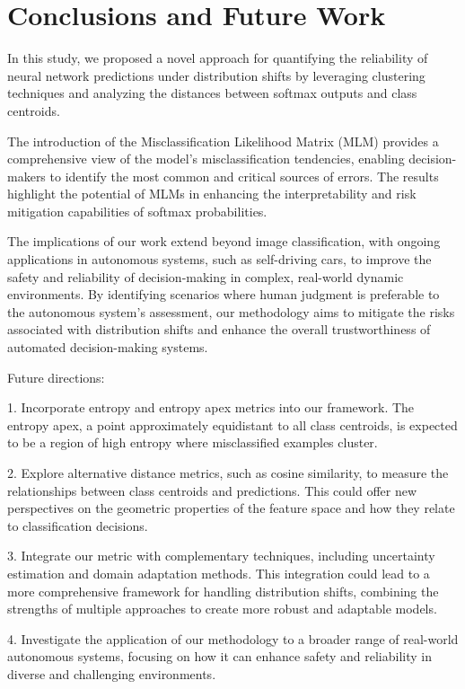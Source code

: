 
\section{Conclusions and Future Work}

In this study, we proposed a novel approach for quantifying the reliability of neural network predictions under distribution shifts by leveraging clustering techniques and analyzing the distances between softmax outputs and class centroids. 

The introduction of the Misclassification Likelihood Matrix (MLM) provides a comprehensive view of the model's misclassification tendencies, enabling decision-makers to identify the most common and critical sources of errors.
The results highlight the potential of MLMs in enhancing the interpretability and risk mitigation capabilities of softmax probabilities.


The implications of our work extend beyond image classification, with ongoing applications in autonomous systems, such as self-driving cars, to improve the safety and reliability of decision-making in complex, real-world dynamic environments. 
By identifying scenarios where human judgment is preferable to the autonomous system's assessment, our methodology aims to mitigate the risks associated with distribution shifts and enhance the overall trustworthiness of automated decision-making systems.

Future directions: 

1. Incorporate entropy and entropy apex metrics into our framework. The entropy apex, a point approximately equidistant to all class centroids, is expected to be a region of high entropy where misclassified examples cluster. 

2. Explore alternative distance metrics, such as cosine similarity, to measure the relationships between class centroids and predictions. This could offer new perspectives on the geometric properties of the feature space and how they relate to classification decisions.

3. Integrate our metric with complementary techniques, including uncertainty estimation and domain adaptation methods. This integration could lead to a more comprehensive framework for handling distribution shifts, combining the strengths of multiple approaches to create more robust and adaptable models.

4. Investigate the application of our methodology to a broader range of real-world autonomous systems, focusing on how it can enhance safety and reliability in diverse and challenging environments.
